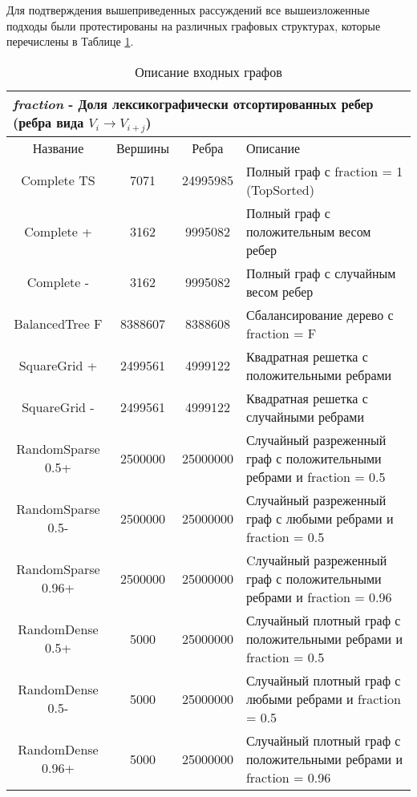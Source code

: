 Для подтверждения вышеприведенных рассуждений все вышеизложенные подходы были протестированы на различных графовых структурах, которые перечислены в Таблице \ref{bf_algo_comparison}. 
\FloatBarrier
\begin{table}[H]
\centering
\caption{Описание входных графов}

\begin{tabular}{c | c | c | l}  
\multicolumn{4}{l}{\footnotesize \textit{fraction} - Доля лексикографически отсортированных ребер (ребра вида $V_i \rightarrow V_{i+j}$) }\\
\hline
Название & Вершины & Ребра & Описание\\
\hline\hline
Complete TS & 7071 & 24995985 & Полный граф с fraction = 1 (TopSorted)\\  
Complete + & 3162 & 9995082 & Полный граф с положительным весом ребер \\  
Complete - & 3162 & 9995082 & Полный граф с случайным весом ребер \\  
BalancedTree F & 8388607 & 8388608 & Сбалансирование дерево с fraction = F \\  
SquareGrid + & 2499561 & 4999122 & Квадратная решетка с положительными ребрами \\  
SquareGrid - & 2499561 & 4999122 & Квадратная решетка с случайными ребрами \\  
RandomSparse 0.5+ & 2500000 & 25000000 & \pbox{9cm}{Случайный разреженный граф с положительными ребрами и fraction = 0.5\\}  \\  
RandomSparse 0.5- & 2500000 & 25000000 & \pbox{9cm}{Случайный разреженный граф с любыми ребрами и fraction = 0.5\\}  \\  
RandomSparse 0.96+ & 2500000 & 25000000 & \pbox{9cm}{Cлучайный разреженный граф с положительными ребрами и fraction = 0.96\\} \\  
RandomDense 0.5+ & 5000 & 25000000 & \pbox{9cm}{Случайный плотный граф с положительными ребрами и fraction = 0.5\\}  \\  
RandomDense 0.5- & 5000 & 25000000 & \pbox{9cm}{Случайный плотный граф с любыми ребрами и fraction = 0.5\\}  \\  
RandomDense 0.96+ & 5000 & 25000000 & \pbox{9cm}{Случайный плотный граф с положительными ребрами и fraction = 0.96\\}  \\  
\hline

\end{tabular}

\label{bf_algo_comparison}
\end{table}
